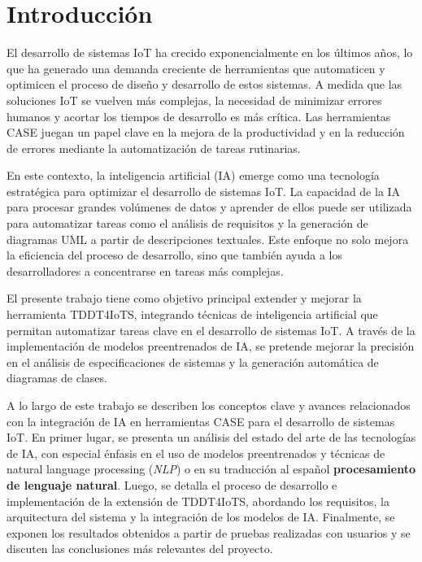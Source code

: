 \label{chapter:introduccion}\chapter{Introducción}

El desarrollo de sistemas IoT ha crecido exponencialmente en los últimos años, lo que ha generado una demanda creciente de herramientas que automaticen y optimicen el proceso de diseño y desarrollo de estos sistemas. A medida que las soluciones IoT se vuelven más complejas, la necesidad de minimizar errores humanos y acortar los tiempos de desarrollo es más crítica. Las herramientas CASE juegan un papel clave en la mejora de la productividad y en la reducción de errores mediante la automatización de tareas rutinarias.

En este contexto, la inteligencia artificial (IA) emerge como una tecnología estratégica para optimizar el desarrollo de sistemas IoT. La capacidad de la IA para procesar grandes volúmenes de datos y aprender de ellos puede ser utilizada para automatizar tareas como el análisis de requisitos y la generación de diagramas UML a partir de descripciones textuales. Este enfoque no solo mejora la eficiencia del proceso de desarrollo, sino que también ayuda a los desarrolladores a concentrarse en tareas más complejas.

El presente trabajo tiene como objetivo principal extender y mejorar la herramienta  TDDT4IoTS, integrando técnicas de inteligencia artificial que permitan automatizar tareas clave en el desarrollo de sistemas IoT. A través de la implementación de modelos preentrenados de IA, se pretende mejorar la precisión en el análisis de especificaciones de sistemas y la generación automática de diagramas de clases.

A lo largo de este trabajo se describen los conceptos clave y avances relacionados con la integración de IA en herramientas CASE para el desarrollo de sistemas IoT. En primer lugar, se presenta un análisis del estado del arte de las tecnologías de IA, con especial énfasis en el uso de modelos preentrenados y técnicas de natural language processing (\textit{NLP}) o en su traducción al español \textbf{procesamiento de lenguaje natural}. Luego, se detalla el proceso de desarrollo e implementación de la extensión de TDDT4IoTS, abordando los requisitos, la arquitectura del sistema y la integración de los modelos de IA. Finalmente, se exponen los resultados obtenidos a partir de pruebas realizadas con usuarios y se discuten las conclusiones más relevantes del proyecto.










